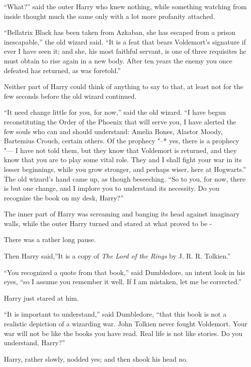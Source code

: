``What?'' said the outer Harry who knew nothing, while something
watching from inside thought much the same only with a lot more
profanity attached.

``Bellatrix Black has been taken from Azkaban, she has escaped from a
prison inescapable,'' the old wizard said. ``It is a feat that bears
Voldemort's signature if ever I have seen it; and she, his most faithful
servant, is one of three requisites he must obtain to rise again in a
new body. After ten years the enemy you once defeated has returned, as
was foretold.''

Neither part of Harry could think of anything to say to that, at least
not for the few seconds before the old wizard continued.

``It need change little for you, for now,'' said the old wizard. ``I
have begun reconstituting the Order of the Phoenix that will serve you,
I have alerted the few souls who can and should understand: Amelia
Bones, Alastor Moody, Bartemius Crouch, certain others. Of the prophecy
"--* yes, there is a prophecy "--- I have not told them, but they know that
Voldemort is returned, and they know that you are to play some vital
role. They and I shall fight your war in its lesser beginnings, while
you grow stronger, and perhaps wiser, here at Hogwarts.'' The old
wizard's hand came up, as though beseeching. ``So to you, for now, there
is but one change, and I implore you to understand its necessity. Do you
recognize the book on my desk, Harry?''

The inner part of Harry was screaming and banging its head against
imaginary walls, while the outer Harry turned and stared at what proved
to be -

There was a rather long pause.

Then Harry said,''It is a copy of \emph{The Lord of the Rings} by J. R.
R. Tolkien.''

``You recognized a quote from that book,'' said Dumbledore, an intent
look in his eyes, ``so I assume you remember it well. If I am mistaken,
let me be corrected.''

Harry just stared at him.

``It is important to understand,'' said Dumbledore, ``that this book is
not a realistic depiction of a wizarding war. John Tolkien never fought
Voldemort. Your war will not be like the books you have read. Real life
is not like stories. Do you understand, Harry?''

Harry, rather slowly, nodded yes; and then shook his head no.

